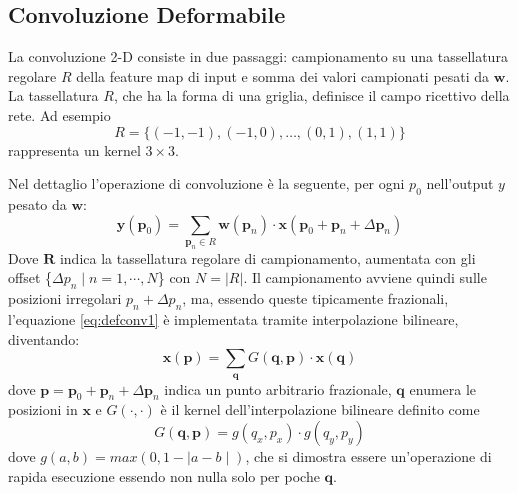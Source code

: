 \documentclass[12pt,a4paper]{report}
\begin{document}
        \subsection{Convoluzione Deformabile}
        La convoluzione 2-D consiste in due passaggi: campionamento su
        una tassellatura regolare $R$ della feature map di input e
        somma dei valori campionati pesati da $\boldsymbol{w}$.
        La tassellatura $R$, che ha la forma di una griglia, definisce
        il campo ricettivo della rete. Ad esempio
        \begin{equation} \label{eq:defconvgrid}
            R=\{(-1,-1), (-1,0),\dots,(0,1),(1,1)\}
        \end{equation}
        rappresenta un kernel $3\times 3$.

        \smallskip
        Nel dettaglio l'operazione di convoluzione \`e la seguente, per
        ogni $p_0$ nell'output $y$ pesato da $\boldsymbol{w}$:
        \begin{equation} \label{eq:defconv1}
            \boldsymbol{y}(\boldsymbol{p}_0) = 
            \sum\limits_{\boldsymbol{p}_n \in R} 
            \boldsymbol{w}(\boldsymbol{p}_n)\cdot 
            \boldsymbol{x}(\boldsymbol{p}_0+
            \boldsymbol{p}_n+\Delta \boldsymbol{p}_n)
        \end{equation}
        Dove $\boldsymbol{R}$ indica la tassellatura regolare di 
        campionamento, aumentata con gli offset \{$\Delta p_n \mid n = 
        1,\cdots,N$\} con $N=|R|$. Il campionamento avviene quindi sulle
        posizioni irregolari $p_n + \Delta p_n$, ma, essendo queste 
        tipicamente frazionali, l'equazione \ref{eq:defconv1} \`e implementata
        tramite interpolazione bilineare, diventando:
        \begin{equation} \label{eq:defconv2}
            \boldsymbol{x}(\boldsymbol{p})=\sum\limits_{\boldsymbol{q}}
            G(\boldsymbol{q},\boldsymbol{p})\cdot\boldsymbol{x}(\boldsymbol{q})
        \end{equation}
        dove $\boldsymbol{p}=\boldsymbol{p}_0+\boldsymbol{p}_n+
        \Delta\boldsymbol{p}_n$ indica un punto arbitrario frazionale, 
        $\textbf{q}$ enumera le posizioni in $\boldsymbol{x}$ e
        $G(\cdot,\cdot)$ \`e il kernel dell'interpolazione bilineare 
        definito come
        \begin{equation} \label{eq:defconv3}
            G(\boldsymbol{q}, \boldsymbol{p}) = g(q_x,p_x)\cdot 
            g(q_y,p_y)
        \end{equation}
        dove $g(a, b) = max(0, 1-\mid a-b\mid)$, che si 
        dimostra essere un'operazione di rapida esecuzione 
        essendo non nulla solo per poche $\boldsymbol{q}$. 
        ~\cite{DBLP:journals/corr/DaiQXLZHW17} 
\end{document}
